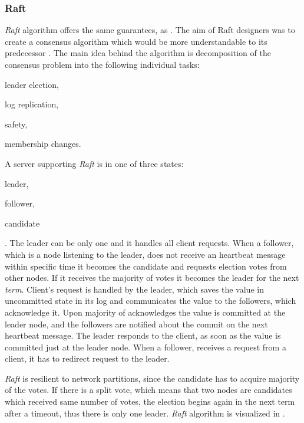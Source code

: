 

\subsubsection{Raft}
\emph{Raft} algorithm offers the same guarantees, as \paxos. 
The aim of Raft designers was to create a consensus algorithm which would be more understandable to its predecessor \cite{ongaro2014search}. 
The main idea behind the algorithm is decomposition of the consensus problem into the following individual tasks:
\begin{enumerate*}
\item leader election,
\item log replication,
\item safety,
\item membership changes.
\end{enumerate*} 
 
 A server supporting \emph{Raft} is in one of three states: \begin{enumerate*} \item leader, \item follower, \item candidate \end{enumerate*}. The leader can be only one and it handles all client requests.
  When a follower, which is a node listening to the leader, does not receive an heartbeat message within specific time it becomes the candidate and requests election votes from other nodes. If it receives the majority of votes it becomes the leader for the next \emph{term}. Client's request is handled by the leader, which saves the value in uncommitted state in its log and communicates the value to the followers, which acknowledge it. Upon majority of acknowledges the value is committed at the leader node, and the followers are notified about the commit on the next heartbeat message. The leader responds to the client, as soon as the value is committed just at the leader node. When a follower, receives a request from a client, it has to redirect request to the leader.

  \emph{Raft} is resilient to network partitions, since the candidate has to acquire majority of the votes. If there is a split vote, which means that two nodes are candidates which received same number of votes, the election begins again in the next term after a timeout, thus there is only one leader.
  \emph{Raft} algorithm is visualized in \cite{raftVisual}.

